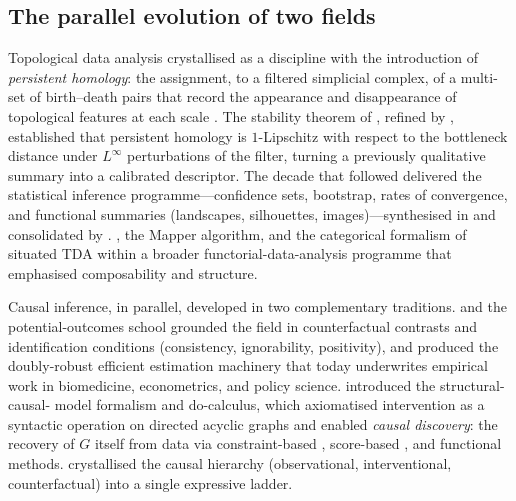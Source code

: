 \subsection{The parallel evolution of two fields}\label{sec:intro_parallel}

Topological data analysis crystallised as a discipline with the
introduction of \emph{persistent homology}: the assignment, to a
filtered simplicial complex, of a multi-set of birth--death pairs that
record the appearance and disappearance of topological features at
each scale \citep{edelsbrunner2002topological,zomorodian2005computing,
edelsbrunner2008persistent}. The stability theorem of
\citet{cohen2007stability}, refined by \citet{chazal2016structure},
established that persistent homology is $1$-Lipschitz with respect to
the bottleneck distance under $L^\infty$ perturbations of the filter,
turning a previously qualitative summary into a calibrated descriptor.
The decade that followed delivered the statistical inference
programme---confidence sets, bootstrap, rates of convergence, and
functional summaries (landscapes, silhouettes, images)---synthesised
in \citet{lecci2014statistical} and consolidated by
\citet{bubenik2015statistical,adams2017persistence,
chazal2014stochastic}. \citet{carlsson2009topology}, the
\citet{singh2007mapper} Mapper algorithm, and the categorical
formalism of \citet{spivak2014category,curry2014sheaves} situated
TDA within a broader functorial-data-analysis programme that
emphasised composability and structure.

Causal inference, in parallel, developed in two complementary
traditions. \citet{rubin1974estimating} and the potential-outcomes
school \citep{rubin2005causal,imbens2015causal} grounded the field in
counterfactual contrasts and identification conditions
(consistency, ignorability, positivity), and produced the
doubly-robust efficient estimation machinery
\citep{robins1989probability,kennedy2024semiparametric,
chernozhukov2018double} that today underwrites empirical work in
biomedicine, econometrics, and policy science. \citet{pearl1995causal,
pearl2009causality,pearl2018book} introduced the structural-causal-
model formalism and do-calculus, which axiomatised intervention as a
syntactic operation on directed acyclic graphs and enabled
\emph{causal discovery}: the recovery of $G$ itself from data via
constraint-based \citep{spirtes2001causation}, score-based
\citep{meek1995strong}, and functional \citep{shimizu2006lingam,
peters2014causal} methods. \citet{bareinboim2020pearls,
ibeling2021topological} crystallised the causal hierarchy
(observational, interventional, counterfactual) into a single
expressive ladder.


